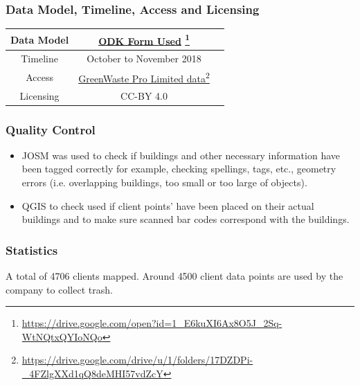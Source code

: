 \documentclass[a4paper,12pt,twoside]{article}
\begin{document}
\subsubsection{Data Model, Timeline, Access and Licensing}
\begin{center}
\begin{tabular}{|c|c|c|}  
 \hline
Data Model &
       \href{https://drive.google.com/open?id=1_E6kuXI6Ax8O5J_2Sq-WtNQtxQYIoNQo}{ODK Form Used} \footnote{\url{https://drive.google.com/open?id=1_E6kuXI6Ax8O5J_2Sq-WtNQtxQYIoNQo}} \\
 \hline
  Timeline  &  October to November 2018 \\
\hline  
 Access  & 
    \href{https://drive.google.com/drive/u/1/folders/17DZDPi-_4FZlgXXd1qQ8deMHI57vdZcY}{GreenWaste Pro Limited data}\footnote{\url{https://drive.google.com/drive/u/1/folders/17DZDPi-_4FZlgXXd1qQ8deMHI57vdZcY}} \\
   
\hline 
    Licensing & CC-BY 4.0 \\
\hline
\end{tabular}
\end{center}

\subsubsection{Quality Control}
\begin{itemize}
    \item JOSM was used to check if buildings and other necessary information have been tagged correctly for example, checking spellings, tags, etc., geometry errors (i.e. overlapping buildings, too small or too large of objects). 
     \item QGIS to check used if client points' have been placed on their actual buildings and to make sure scanned bar codes correspond with the buildings.
\end{itemize}

\subsubsection{Statistics}
A total of 4706 clients mapped.
Around 4500 client data points are used by the company to collect trash.

\newpage
\end{document}
